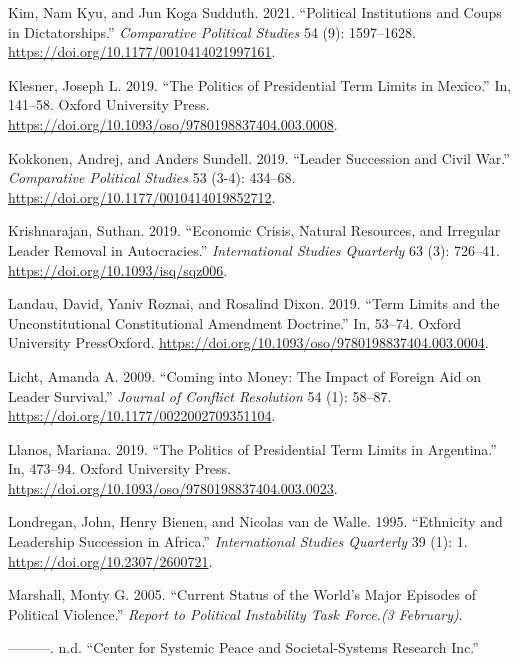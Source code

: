 \documentclass[
  12pt,
]{report}
\newlength{\cslhangindent}
\newenvironment{CSLReferences}[2] %
 {\begin{list}{}{%
  \setlength{\itemindent}{0pt}
  \setlength{\leftmargin}{0pt}
  \setlength{\parsep}{0pt}
  \ifodd #1
   \setlength{\leftmargin}{\cslhangindent}
   \setlength{\itemindent}{-1\cslhangindent}
  \fi
  \setlength{\itemsep}{#2\baselineskip}}}
 {\end{list}}
\begin{document}
\begin{CSLReferences}{1}{0}
Kim, Nam Kyu, and Jun Koga Sudduth. 2021. {``Political Institutions and
Coups in Dictatorships.''} \emph{Comparative Political Studies} 54 (9):
1597--1628. \url{https://doi.org/10.1177/0010414021997161}.

Klesner, Joseph L. 2019. {``The Politics of Presidential Term Limits in
Mexico.''} In, 141--58. Oxford University Press.
\url{https://doi.org/10.1093/oso/9780198837404.003.0008}.

Kokkonen, Andrej, and Anders Sundell. 2019. {``Leader Succession and
Civil War.''} \emph{Comparative Political Studies} 53 (3-4): 434--68.
\url{https://doi.org/10.1177/0010414019852712}.

Krishnarajan, Suthan. 2019. {``Economic Crisis, Natural Resources, and
Irregular Leader Removal in Autocracies.''} \emph{International Studies
Quarterly} 63 (3): 726--41. \url{https://doi.org/10.1093/isq/sqz006}.

Landau, David, Yaniv Roznai, and Rosalind Dixon. 2019. {``Term Limits
and the Unconstitutional Constitutional Amendment Doctrine.''} In,
53--74. Oxford University PressOxford.
\url{https://doi.org/10.1093/oso/9780198837404.003.0004}.

Licht, Amanda A. 2009. {``Coming into Money: The Impact of Foreign Aid
on Leader Survival.''} \emph{Journal of Conflict Resolution} 54 (1):
58--87. \url{https://doi.org/10.1177/0022002709351104}.

Llanos, Mariana. 2019. {``The Politics of Presidential Term Limits in
Argentina.''} In, 473--94. Oxford University Press.
\url{https://doi.org/10.1093/oso/9780198837404.003.0023}.

Londregan, John, Henry Bienen, and Nicolas van de Walle. 1995.
{``Ethnicity and Leadership Succession in Africa.''} \emph{International
Studies Quarterly} 39 (1): 1. \url{https://doi.org/10.2307/2600721}.

Marshall, Monty G. 2005. {``Current Status of the World's Major Episodes
of Political Violence.''} \emph{Report to Political Instability Task
Force.(3 February)}.

---------. n.d. {``Center for Systemic Peace and Societal-Systems
Research Inc.''}


\end{CSLReferences}
\end{document}
